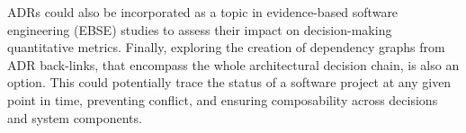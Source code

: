         ADRs could also be incorporated as a topic in evidence-based software engineering (EBSE) studies \cite{evidence_based_software_eng} to assess their impact on decision-making quantitative metrics. Finally, exploring the creation of dependency graphs from ADR back-links, that encompass the whole architectural decision chain, is also an option. This could potentially trace the status of a software project at any given point in time, preventing conflict, and ensuring composability across decisions and system components.
